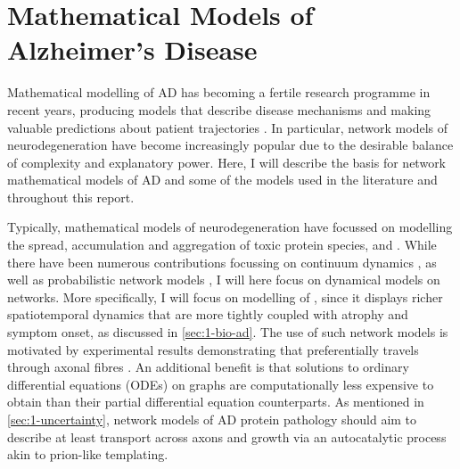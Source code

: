 \chapter{Mathematical Models of Alzheimer's Disease}
\label{chp:2}
Mathematical modelling of AD has becoming a fertile research programme in recent
years, producing models that describe disease mechanisms and making valuable
predictions about patient trajectories \cite{raj2015network, fornari2019prion,
thompson2020, schafer2022correlating}. In particular, network models of
neurodegeneration have become increasingly popular due to the desirable balance
of complexity and explanatory power. Here, I will describe the basis for network
mathematical models of AD and some of the models used in the literature and
throughout this report.

Typically, mathematical models of neurodegeneration have focussed on modelling
the spread, accumulation and aggregation of toxic protein species, \TP and \AB.
While there have been numerous contributions focussing on continuum dynamics
\cite{weickenmeier2018multiphysics,fornari2020spatially}, as well as
probabilistic network models \cite{vogel2020spread}, I will here focus on
dynamical models on networks. More specifically, I will focus on modelling of
\TP, since it displays richer spatiotemporal dynamics that are more tightly
coupled with atrophy and symptom onset, as discussed in \cref{sec:1-bio-ad}. The
use of such network models is motivated by experimental results demonstrating
that \TP preferentially travels through axonal fibres \cite{liu2012trans,
de2012propagation, devos2018synaptic}.  
An additional benefit is that solutions to ordinary differential equations
(ODEs) on graphs are computationally less expensive to obtain than their partial
differential equation counterparts. As mentioned in
\cref{sec:1-uncertainty}, network models of AD protein pathology should aim to
describe at least transport across axons and growth via an autocatalytic process
akin to prion-like templating.

